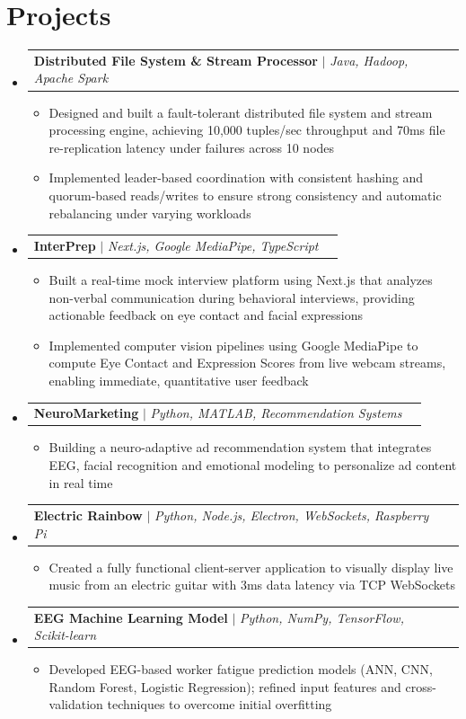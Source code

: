 \documentclass[letterpaper,11pt]{article}
\makeatletter
\newcommand{\resumeItem}[1]{\item\small{#1 \vspace{-2pt}}}
\newcommand{\resumeProjectHeading}[2]{
    \item
    \begin{tabular*}{0.97\textwidth}{l@{\extracolsep{\fill}}r}
      \small#1 & #2 \\
    \end{tabular*}\vspace{-7pt}
}
\newcommand{\resumeSubHeadingListStart}{\begin{itemize}[leftmargin=0.15in, label={}]}
\newcommand{\resumeSubHeadingListEnd}{\end{itemize}}
\newcommand{\resumeItemListStart}{\begin{itemize}}
\newcommand{\resumeItemListEnd}{\end{itemize}\vspace{-5pt}}
\makeatother
\begin{document}
\section{Projects}
    \resumeSubHeadingListStart

      \resumeProjectHeading
          {\textbf{Distributed File System \& Stream Processor} $|$ \emph{Java, Hadoop, Apache Spark}}{}
          \resumeItemListStart
            \resumeItem{Designed and built a fault-tolerant distributed file system and stream processing engine, achieving 10,000 tuples/sec throughput and 70ms file re-replication latency under failures across 10 nodes}
            \resumeItem{Implemented leader-based coordination with consistent hashing and quorum-based reads/writes to ensure strong consistency and automatic rebalancing under varying workloads}
          \resumeItemListEnd

      \resumeProjectHeading
          {\textbf{InterPrep} $|$ \emph{Next.js, Google MediaPipe, TypeScript}}{}
          \resumeItemListStart
            \resumeItem{Built a real-time mock interview platform using Next.js that analyzes non-verbal communication during behavioral interviews, providing actionable feedback on eye contact and facial expressions}
            \resumeItem{Implemented computer vision pipelines using Google MediaPipe to compute Eye Contact and Expression Scores from live webcam streams, enabling immediate, quantitative user feedback}
          \resumeItemListEnd

      \resumeProjectHeading
          {\textbf{NeuroMarketing} $|$ \emph{Python, MATLAB, Recommendation Systems}}{}
          \resumeItemListStart
            \resumeItem{Building a neuro-adaptive ad recommendation system that integrates EEG, facial recognition and emotional modeling to personalize ad content in real time}
          \resumeItemListEnd

      \resumeProjectHeading
          {\textbf{Electric Rainbow} $|$ \emph{Python, Node.js, Electron, WebSockets, Raspberry Pi}}{}
          \resumeItemListStart
            \resumeItem{Created a fully functional client-server application to visually display live music from an electric guitar with 3ms data latency via TCP WebSockets}
          \resumeItemListEnd

      \resumeProjectHeading
          {\textbf{EEG Machine Learning Model} $|$ \emph{Python, NumPy, TensorFlow, Scikit-learn}}{}
          \resumeItemListStart
            \resumeItem{Developed EEG-based worker fatigue prediction models (ANN, CNN, Random Forest, Logistic Regression); refined input features and cross-validation techniques to overcome initial overfitting}
          \resumeItemListEnd

    \resumeSubHeadingListEnd
\end{document}
